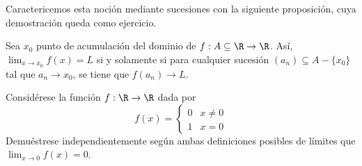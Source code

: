 Caractericemos esta noción mediante sucesiones con la siguiente proposición, cuya demostración queda como ejercicio.

\begin{proposition}
    Sea $x_0$ punto de acumulación del dominio de $f: A \subseteq \R \to \R$. Así, $\lim_{x \to x_0} f(x) = L$ si y solamente si para cualquier sucesión $(a_n) \subseteq A - \{x_0\}$ tal que $a_n \to x_0$, se tiene que $f(a_n) \to L$.
\end{proposition}

\begin{example}
    Considérese la función $f: \R \to \R$ dada por
    \[f(x) = \begin{cases}
        0 & x \neq 0\\
        1 & x = 0
    \end{cases}\]
    Demuéstrese independientemente según ambas definiciones posibles de límites que $\lim_{x \to 0} f(x) = 0$.
\end{example}
